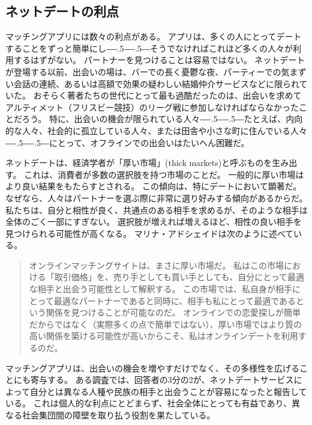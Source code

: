 \documentclass[paper=a4,book,openany]{jlreq}
\def\DDASH{―\kern-.5\zw―\kern-.5\zw―}
\begin{document}
\subsection{ネットデートの利点}

マッチングアプリには数々の利点がある。
アプリは、多くの人にとってデートすることをずっと簡単にし{\DDASH}そうでなければこれほど多くの人々が利用するはずがない。
パートナーを見つけることは容易ではない。
ネットデートが登場する以前、出会いの場は、バーでの長く憂鬱な夜、パーティーでの気まずい会話の連続、あるいは高額で効果の疑わしい結婚仲介サービスなどに限られていた。
おそらく著者たちの世代にとって最も過酷だったのは、出会いを求めてアルティメット（フリスビー競技）のリーグ戦に参加しなければならなかったことだろう。
特に、出会いの機会が限られている人々{\DDASH}たとえば、内向的な人々、社会的に孤立している人々、または田舎や小さな町に住んでいる人々{\DDASH}にとって、オフラインでの出会いはたいへん困難だ。

ネットデートは、経済学者が「厚い市場」(thick markets)と呼ぶものを生み出す。
これは、消費者が多数の選択肢を持つ市場のことだ。
一般的に厚い市場はより良い結果をもたらすとされる。
この傾向は、特にデートにおいて顕著だ。
なぜなら、人々はパートナーを選ぶ際に非常に選り好みする傾向があるからだ。
私たちは、自分と相性が良く、共通点のある相手を求めるが、そのような相手は全体のごく一部にすぎない。
選択肢が増えれば増えるほど、相性の良い相手を見つけられる可能性が高くなる。
マリナ・アドシェイドは次のように述べている。

\begin{quote}
  オンラインマッチングサイトは、まさに厚い市場だ。
私はこの市場における「取引価格」を、売り手としても買い手としても、自分にとって最適な相手と出会う可能性として解釈する。
この市場では、私自身が相手にとって最適なパートナーであると同時に、相手も私にとって最適であるという関係を見つけることが可能なのだ。
オンラインでの恋愛探しが簡単だからではなく（実際多くの点で簡単ではない）、厚い市場ではより質の高い関係を築ける可能性が高いからこそ、私はオンラインデートを利用するのだ。
\citep[p.8]{adshade13:_dollar_sex}

\end{quote}

マッチングアプリは、出会いの機会を増やすだけでなく、その多様性を広げることにも寄与する。
ある調査では、回答者の3分の2が、ネットデートサービスによって自分とは異なる人種や民族の相手と出会うことが容易になったと報告している\citep{hergovich17:_stren_absen_ties}。
これは個人的な利点にとどまらず、社会全体にとっても有益であり、異なる社会集団間の障壁を取り払う役割を果たしている。
\end{document}
